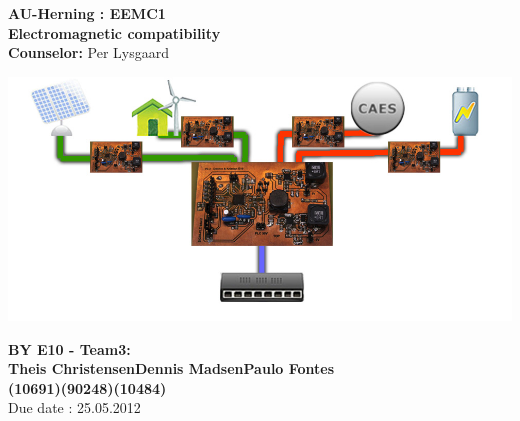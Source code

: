 \begin{centering}
\thispagestyle{empty} %
\begin{center}
\textbf{\Huge {AU-Herning : EEMC1\\[0.1cm]Electromagnetic compatibility}}\\
\huge { }\vspace{0.4cm}
\large{\textbf{Counselor:} Per Lysgaard}\\ \vspace{0.0cm}
\hspace{3cm}
\end{center}

\centering
\includegraphics[width=1\textwidth]{images/frontpage.jpg}
 \end{centering}
 
 
\begin{center}
\vspace{0.4cm}
\Large{\textbf{BY E10 - Team3: \\ \vspace{0.2cm}Theis Christensen\hspace{1.5cm}Dennis Madsen\hspace{1.5cm}Paulo Fontes}
\\\textbf{(10691)\hspace{3.7cm}(90248)\hspace{3.7cm}(10484)}}
\\\vspace{5cm}\Large{Due date : 25.05.2012}
\end{center}
\newpage
\thispagestyle{empty}
\mbox{}